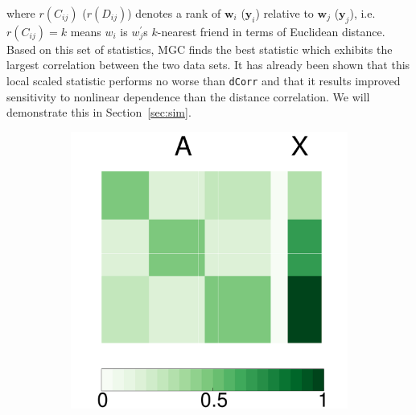 \documentclass[12pt]{article}
\theoremstyle{definition}
\begin{document}
where $r(C_{ij})$ ($r(D_{ij})$) denotes a rank of $\mathbf{w}_{i}$ ($\mathbf{y}_{i}$) relative to $\mathbf{w}_{j}$ ($\mathbf{y}_{j}$), i.e. $r(C_{ij}) = k$ means $w_{i}$ is $w^{'}_{j}$s $k$-nearest friend in terms of Euclidean distance. Based on this set of statistics, MGC finds the best statistic which exhibits the largest correlation between the two data sets. It has already been shown that this local scaled statistic performs no worse than \texttt{dCorr} and that it results improved sensitivity to nonlinear dependence than the distance correlation. We will demonstrate this in Section~\ref{sec:sim}.

\begin{figure}[H]
	\centering
	\begin{subfigure}[b]{0.23\textwidth}
		\includegraphics[width=\textwidth]{../Figure/Pmat.pdf}
		\caption{}
		\label{fig:a}
	\end{subfigure}
	~ %
	\begin{subfigure}[b]{0.23\textwidth}

\end{subfigure}
\end{figure}
\end{document}
